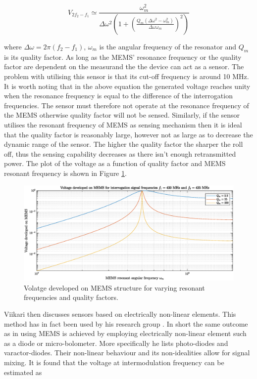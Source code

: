 \documentclass[11pt,a4paper]{article}
\begin{document}
\begin{equation}
V_{2f_2-f_1} \simeq \frac{\omega_m^2}{\Delta \omega^2 \left(1+\left( \frac{Q_m \left(\Delta \omega^2 - \omega_m^2 \right)}{\Delta \omega \omega_m} \right)^2 \right)}
\end{equation}

where $\Delta \omega = 2\pi (f_2-f_1)$, $\omega_m$ is the angular frequency of the resonator and $Q_m$ is its quality factor. As long as the MEMS' resonance frequency or the quality factor are dependent on the measurand the the device can act as a sensor. The problem with utilising this sensor is that its cut-off frequency is around 10 MHz. It is worth noting that in the above equation the generated voltage reaches unity when the resonance frequency is equal to the difference of the interrogation frequencies. The sensor must therefore not operate at the resonance frequency of the MEMS otherwise quality factor will not be sensed. Similarly, if the sensor utilises the resonant frequency of MEMS as sensing mechanism then it is ideal that the quality factor is reasonably large, however not as large as to decrease the dynamic range of the sensor. The higher the quality factor the sharper the roll off, thus the sensing capability decreases as there isn't enough retransmitted power. The plot of the voltage as a function of quality factor and MEMS resonant frequency is shown in Figure \ref{fig:vol}.


\begin{figure}[h]
\centering
\includegraphics[width=1\textwidth]{voltage.eps}
\caption{Volatge developed on MEMS structure for varying resonant frequencies and quality factors.\label{fig:vol}}
\end{figure}

Viikari then discusses sensors based on electrically non-linear elements. This method has in fact been used by his research group \cite{icp1,icp2,icp3,icp4}. In short the same outcome as in using MEMS is achieved by employing electrically non-linear element such as a diode or micro-bolometer. More specifically he lists photo-diodes and varactor-diodes. Their non-linear behaviour and its non-idealities allow for signal mixing. It is found that the voltage at intermodulation frequency can be estimated as
\end{document}
